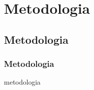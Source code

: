 \section{Metodologia}

\subsection{Metodologia}

\begin{frame}\frametitle{Metodologia} 
metodologia
\end{frame}